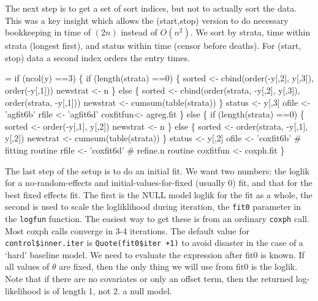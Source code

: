 \documentclass{article}
\begin{document}
The next step is to get a set of sort indices, but not to actually
sort the data.  This was a key insight which allows the (start,stop)
version to do necessary bookkeeping in time of $(2n)$ instead of $O(n^2)$.
We sort by strata, time within strata (longest first), and status within
time (censor before deaths).  For (start, stop) data a second index 
orders the entry times.
\begin{nwchunk}
=
     if (ncol(y) ==3) \{
         if (length(strata) ==0) \{
             sorted <- cbind(order(-y[,2], y[,3]), 
                             order(-y[,1]))
             newstrat <- n
             \}
         else \{
             sorted <- cbind(order(strata, -y[,2], y[,3]),
                             order(strata, -y[,1]))
             newstrat  <- cumsum(table(strata))
             \}
         status <- y[,3]
         ofile <-  'agfit6b'
         rfile <-  'agfit6d'
         coxfitfun<- agreg.fit
         \}
     else \{
         if (length(strata) ==0) \{
             sorted <- order(-y[,1], y[,2])
             newstrat <- n
             \}
         else \{
             sorted <- order(strata, -y[,1], y[,2])
             newstrat <-  cumsum(table(strata))
             \}
         status <- y[,2]
         ofile <- 'coxfit6b' # fitting routine
         rfile <- 'coxfit6d' # refine.n routine
         coxfitfun <- coxph.fit
         \}
\end{nwchunk}

The last step of the setup is to do an initial fit.  
We want two numbers: the loglik for a  no-random-effects and
initial-values-for-fixed (usually 0)
fit, and that for the best fixed effects fit.
The first is the NULL model loglik for the fit as a whole, the second
is used to scale the logliklihood during iteration, the \Verb!fit0! parameter
in the \Verb!logfun! function.
The easiest way to get these is from an ordinary \Verb!coxph! call.
Most coxph calls converge in 3-4 iterations.  The default value
for \Verb!control$inner.iter! is \Verb?Quote(fit0$iter +1)? to avoid disaster in the
case of a `hard' baseline model. We need to evaluate the expression  %
after fit0 is known.
If all values of $\theta$ are fixed, then the only thing we will
use from fit0 is the loglik.
Note that if there are no covariates or only an offset term, then 
the returned log-likelihood is of length 1, not 2.
a null model.
\end{document}

